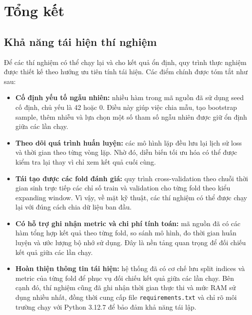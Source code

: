 \section{Tổng kết}

\subsection{Khả năng tái hiện thí nghiệm}

Để các thí nghiệm có thể chạy lại và cho kết quả ổn định, quy trình thực nghiệm được thiết kế theo hướng ưu tiên tính tái hiện. Các điểm chính được tóm tắt như sau:

\begin{itemize}[labelsep=10pt, leftmargin=1.8cm]
    \item \textbf{Cố định yếu tố ngẫu nhiên:} nhiều hàm trong mã nguồn đã sử dụng seed cố định, chủ yếu là 42 hoặc 0. Điều này giúp việc chia mẫu, tạo bootstrap sample, thêm nhiễu và lựa chọn một số tham số ngẫu nhiên được giữ ổn định giữa các lần chạy.

    \item \textbf{Theo dõi quá trình huấn luyện:} các mô hình lặp đều lưu lại lịch sử loss và thời gian theo từng vòng lặp. Nhờ đó, diễn biến tối ưu hóa có thể được kiểm tra lại thay vì chỉ xem kết quả cuối cùng.

    \item \textbf{Tái tạo được các fold đánh giá:} quy trình cross-validation theo chuỗi thời gian sinh trực tiếp các chỉ số train và validation cho từng fold theo kiểu expanding window. Vì vậy, về mặt kỹ thuật, các thí nghiệm có thể được chạy lại với đúng cách chia dữ liệu ban đầu.

    \item \textbf{Có hỗ trợ ghi nhận metric và chi phí tính toán:} mã nguồn đã có các hàm tổng hợp kết quả theo từng fold, so sánh mô hình, đo thời gian huấn luyện và ước lượng bộ nhớ sử dụng. Đây là nền tảng quan trọng để đối chiếu kết quả giữa các lần chạy.

    \item \textbf{Hoàn thiện thông tin tái hiện:} hệ thống đã có cơ chế lưu split indices và metric của từng fold để phục vụ đối chiếu kết quả giữa các lần chạy. Bên cạnh đó, thí nghiệm cũng đã ghi nhận thời gian thực thi và mức RAM sử dụng nhiều nhất, đồng thời cung cấp file \texttt{requirements.txt} và chỉ rõ môi trường chạy với Python 3.12.7 để bảo đảm khả năng tái lập.
\end{itemize}

